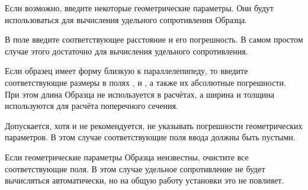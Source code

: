 Если возможно, введите некоторые геометрические параметры. Они будут использоваться для вычисления удельного сопротивления Образца. 

В поле  введите соответствующее расстояние и его погрешность. В самом простом случае этого достаточно для вычисления удельного сопротивления.

Если образец имеет форму близкую к параллелепипеду, то введите соответствующие размеры в полях ,  и , а также их абсолютные погрешности. При этом длина Образца не используется в расчётах, а ширина и толщина используются для расчёта поперечного сечения.

Допускается, хотя и не рекомендуется, не указывать погрешности геометрических параметров. В этом случае соответствующие поля ввода должны быть пустыми.

Если геометрические параметры Образца неизвестны, очистите все соответствующие поля. В этом случае удельное сопротивление не будет вычисляться автоматически, но на общую работу установки это не повлияет.
